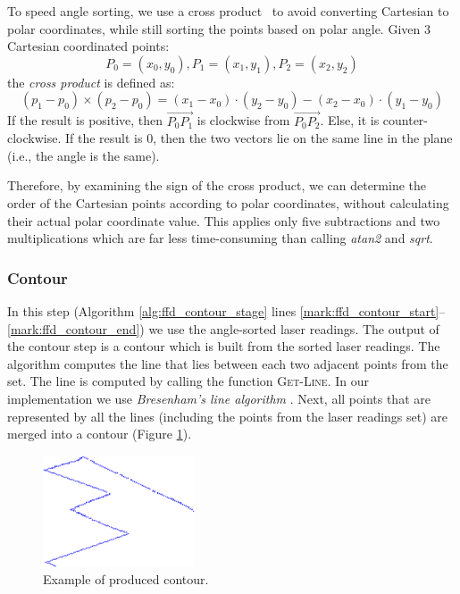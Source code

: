 	To speed angle sorting, we use a cross product~\cite{Cormen2001} to avoid converting
        Cartesian to polar coordinates, while still sorting the points based on polar angle.
	Given 3 Cartesian coordinated points: 
	$$P_0 =(x_0, y_0), P_1 =(x_1, y_1), P_2 =(x_2, y_2)$$  
	the \emph{cross product} is defined as: 
	$$(p_1 - p_0) \times (p_2 -p_0) =
	(x_1-x_0)\cdot(y_2-y_0)-(x_2-x_0)\cdot(y_1-y_0)$$  
	If the result is positive, then $\overrightarrow{P_0P_1}$ is clockwise from
	$\overrightarrow{P_0P_2}$. Else, it is counter-clockwise. If the result is 0,
	then the two vectors lie on the same line in the plane (i.e., the angle is the same).
	
	Therefore, by examining the sign of the cross product, we can determine the
	order of the Cartesian points according to polar coordinates, without
	calculating their actual polar coordinate value. This applies only five
	subtractions and two multiplications which are far less time-consuming than
	calling \emph{atan2} and \emph{sqrt}.	

  
	
\subsubsection{Contour}
In this step (Algorithm \ref{alg:ffd_contour_stage} lines
\ref{mark:ffd_contour_start}--\ref{mark:ffd_contour_end}) we use the
angle-sorted laser readings. The output of the contour step is a contour which
is built from the sorted laser readings. The algorithm computes the line that
lies between each two adjacent points from the set. The line is computed by
calling the function \textsc{Get-Line}. In our implementation we use
\emph{Bresenham's line algorithm} \cite{bresenham2010algorithm}. Next, all
points that are represented by all the lines (including the points from the
laser readings set) are merged into a contour (Figure \ref{fig:get_line_example}).


	

\begin{figure}[htbp]
  \centering
    \includegraphics[width=0.4\textwidth,keepaspectratio]{get_line_example}
  \caption{Example of produced contour.}
	 \label{fig:get_line_example}
\end{figure}


